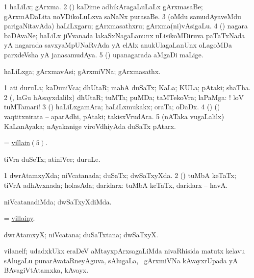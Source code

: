 \bentry
{} 
\gl{\nA}
\expl{}
\bmng
\bnum
\num{1} haLiLx; gArxma. 
\num{2} (\ame) kaDime adhikAragaLuLaLx gArxmasaBe; gArxmADaLita noVDikoLuLxva saNaNx purasaBe. 
\num{3} (oMdu samudAyaveMdu parigaNitavAda) haLiLxgaru; gArxmasathxru; gArxma(ni)vAsigaLu. 
\num{4} (\birx) nagara baDAvaNe; haLiLx jiVvanada lakaSxNagaLanunx uLisikoMDiruva paTaTxNada yA nagarada savxyaMpUNaRvAda yA elAlx anukUlagaLanUnx oLagoMDa parxdeVsha yA janasamudAya. 
\num{5} (\AseTxrXV) upanagarada aMgaDi maLige. 
\enum
\emng
\eentry

\bentry
{} 
\gl{\nA}
\expl{}
\bmng
 haLiLxga; gArxmavAsi; gArxmiVNa; gArxmasathx. 
\emng
\eentry

\bentry
{} 
\gl{\nA}
\expl{}
\bmng
\bnum
\num{1} ati duruLa; kaDuniVca; dhUtaR; mahA duSaTx; KaLa; KULa; pAtaki; shaTha. 
\num{2} (\AmA, laGu hAsayxdalilx) dhUtaR; tuMTa; puMDa; taMTekoVra; laPaMga: ! loV tuMTamari! 
\num{3} (\pArxparx) haLiLxgamAra; haLiLxmukakx; oraTa; oDaDx. 
\num{4} (\birx) (\AmA) vaqtitxnirata -- aparAdhi, pAtaki; takisxVrudAra. 
\hypertarget{villain(5)}{} 
\num{5} (nATaka \mo vugaLalilx) KaLanAyaka; nAyakanige viroVdhiyAda duSaTx pAtarx. 
\enum
\emng

\noindent 
\gl{\pagu}
\expl{}
\bmng
{} = \hyperlink{villain(5)}{villain\((5)\)}. 
\emng
\eentry

\bentry
{} 
\gl{\nA}
\expl{}
\bmng
 tiVra duSeTx; atiniVce; duruLe. 
\emng
\eentry

\bentry
{} 
\gl{\gu}
\expl{}
\bmng
\bnum
\num{1} dwrAtamxyXda; niVcatanada; duSaTx; dwSaTxyXda. 
\num{2} (\AmA) tuMbA keTaTx; tiVrA adhAvxnada; holasAda; daridarx:  tuMbA keTaTx, daridarx -- havA. 
\enum
\emng
\eentry

\bentry
{} 
\gl{\kirxvi}
\expl{}
\bmng
 niVcatanadiMda; dwSaTxyXdiMda. 
\emng
\eentry

\bentry
{} 
\gl{\nA}
\expl{}
\bmng
 = \hyperlink{villainy}{villainy}. 
\emng
\eentry

\bentry
{} 
\gl{\nA}
\bmng
 dwrAtamxyX; niVcatana; duSaTxtana; dwSaTxyX. 
\emng
\eentry

\bentry
{} 
\gl{\nA}
\expl{}
\bmng
 vilanelf; udadxkUkx eraDeV aMtayxpArxsagaLiMda nivaRhisida matutx kelavu sAlugaLu punarAvataRneyAguva,  sAlugaLa, \sA\ gArxmiVNa kAvayxrUpada yA BAvagiVtAtamxka, kAvayx. 
\emng
\eentry

